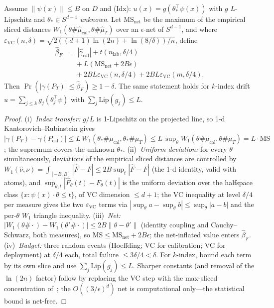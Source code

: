 \begin{theorem}\label{thm:aud-F}
Assume $\|\psi(x)\|\le B$ on $D$ and \textup{(Idx)}: $u(x)=g(\theta_*^{\!\top}\psi(x))$ with
$g$ $L$-Lipschitz and $\theta_*\in S^{d-1}$ \emph{unknown}. Let
$\mathrm{MS}_{\mathrm{net}}$ be the maximum of the empirical sliced distances
$W_1(\theta\#\widehat\mu_{\mathrm{cal}},\theta\#\widehat\mu_T)$ over an $\epsilon$-net of
$S^{d-1}$, and
where
$\varepsilon_{\mathrm{VC}}(n,\delta)=
\sqrt{2((d{+}1)\ln(2n)+\ln(8/\delta))/n}$, define
\begin{align*}
\widehat\beta_{F}
&=|\widehat\gamma_{\mathrm{cal}}|+t(n_{\mathrm{lab}},\delta/4)\\
&\quad+L(\mathrm{MS}_{\mathrm{net}}+2B\epsilon)\\
&\quad+2BL\varepsilon_{\mathrm{VC}}(n,\delta/4)
 +2BL\varepsilon_{\mathrm{VC}}(m,\delta/4).
\end{align*}
Then $\Pr(|\gamma(P_T)|\le\widehat\beta_{F})\ge1-\delta$. The same statement holds for
$k$-index drift $u=\sum_{j\le k}g_j(\theta_j^{\!\top}\psi)$ with $\sum_j\mathrm{Lip}(g_j)\le L$.
\end{theorem}
\begin{proof}
(i)~\emph{Index transfer:} $g/L$ is 1-Lipschitz on the projected line, so 1-d
Kantorovich--Rubinstein gives
$|\gamma(P_T)-\gamma(P_{\mathrm{cal}})|\le L\,W_1(\theta_*\#\mu_{\mathrm{cal}},\theta_*\#\mu_T)
\le L\,\sup_{\theta}W_1(\theta\#\mu_{\mathrm{cal}},\theta\#\mu_T)=L\cdot\mathrm{MS}$; the
supremum covers the unknown $\theta_*$.
(ii)~\emph{Uniform deviation:} for every $\theta$ simultaneously, deviations of the empirical
sliced distances are controlled by
$W_1(\widehat\nu,\nu)=\int_{[-B,B]}|\widehat F-F|\le 2B\sup_t|\widehat F-F|$ (the 1-d identity,
valid with atoms), and $\sup_{\theta,t}|\widehat F_\theta(t)-F_\theta(t)|$ is the uniform
deviation over the halfspace class $\{x:\psi(x)\cdot\theta\le t\}$, of VC dimension $\le d+1$;
the VC inequality at level $\delta/4$ per measure gives the two
$\varepsilon_{\mathrm{VC}}$ terms via $|\sup_\theta a-\sup_\theta b|\le\sup_\theta|a-b|$ and the
per-$\theta$ $W_1$ triangle inequality.
(iii)~\emph{Net:} $|W_1(\theta\#\cdot)-W_1(\theta'\#\cdot)|\le 2B\|\theta-\theta'\|$ (identity
coupling and Cauchy--Schwarz, both measures), so
$\mathrm{MS}\le\mathrm{MS}_{\mathrm{net}}+2B\epsilon$; the net-inflated value enters
$\widehat\beta_F$.
(iv)~\emph{Budget:} three random events (Hoeffding; VC for calibration; VC for deployment) at
$\delta/4$ each, total failure $\le3\delta/4<\delta$. For $k$-index, bound each term by its own
slice and use $\sum_j\mathrm{Lip}(g_j)\le L$.
Sharper constants (and removal of the $\ln(2n)$ factor) follow by replacing the VC step with
the max-sliced concentration of~\cite{bartl2022structure,boedihardjo2024sharp}; the
$O((3/\epsilon)^d)$ net is computational only---the statistical bound is net-free.
\end{proof}

